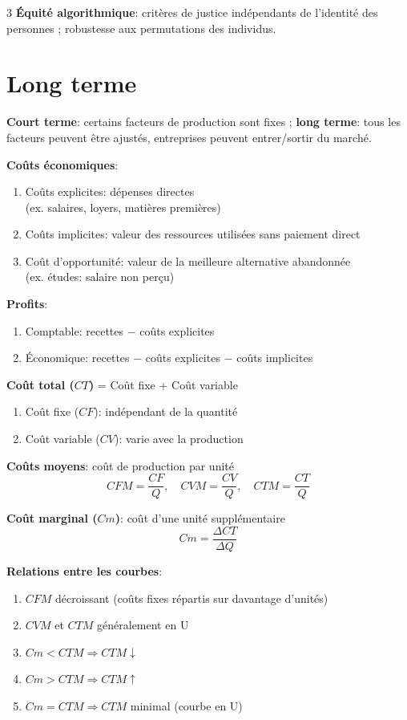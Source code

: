 \documentclass[12pt, a4paper]{article}
\begin{document}
\begin{multicols*}{3}
\textbf{Équité algorithmique}: critères de justice indépendants de l'identité des personnes ; robustesse aux permutations des individus.

\colbreak
\section{Long terme}

\textbf{Court terme}: certains facteurs de production sont fixes ; \textbf{long terme}: tous les facteurs peuvent être ajustés, entreprises peuvent entrer/sortir du marché.

\textbf{Coûts économiques}:
\begin{enumerate}[\roman*.]
  \item Coûts explicites: dépenses directes\\(ex. salaires, loyers, matières premières)
  \item Coûts implicites: valeur des ressources utilisées sans paiement direct
  \item Coût d'opportunité: valeur de la meilleure alternative abandonnée\\(ex. études: salaire non perçu)
\end{enumerate}

\textbf{Profits}:
\begin{enumerate}[\roman*.]
  \item Comptable: recettes $-$ coûts explicites
  \item Économique: recettes $-$ coûts explicites $-$ coûts implicites
\end{enumerate}

\textbf{Coût total ($CT$)} = Coût fixe + Coût variable 
\begin{enumerate}[\roman*.]
  \item Coût fixe ($CF$): indépendant de la quantité
  \item Coût variable ($CV$): varie avec la production
\end{enumerate}

\textbf{Coûts moyens}: coût de production par unité
\[
\boxed{
CFM=\frac{CF}{Q},\quad
CVM=\frac{CV}{Q},\quad
CTM=\frac{CT}{Q}}
\]

\textbf{Coût marginal ($Cm$)}: coût d'une unité supplémentaire
\[
\boxed{Cm=\frac{\Delta CT}{\Delta Q}}
\]

\textbf{Relations entre les courbes}:
\begin{enumerate}[\roman*.]
  \item $CFM$ décroissant (coûts fixes répartis sur davantage d'unités)
  \item $CVM$ et $CTM$ généralement en U
  \item $Cm<CTM\Rightarrow CTM\downarrow$
  \item $Cm>CTM\Rightarrow CTM\uparrow$
  \item $Cm=CTM\Rightarrow CTM$ minimal (courbe en U)
\end{enumerate}


\end{multicols*}
\end{document}
